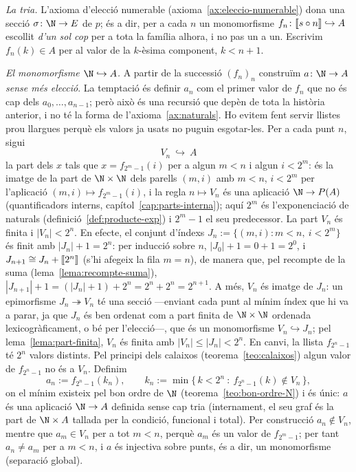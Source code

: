 \begin{prova}
\emph{La tria.} L'axioma d'elecció numerable
(axioma~\ref{ax:eleccio-numerable}) dona una secció
\(\sigma\colon\N\to E\) de \(p\); és a dir, per a cada \(n\) un monomorfisme
\(f_n\colon\llbracket s\circ n\rrbracket\hookrightarrow A\) escollit \emph{d'un sol cop}
per a tota la família alhora, i no pas un a un. Escrivim
\(f_n(k)\in A\) per al valor de la \(k\)-èsima component,
\(k<n+1\).

\emph{El monomorfisme \(\N\hookrightarrow A\).} A partir de la successió
\((f_n)_n\) construïm \(a\colon\N\to A\) \emph{sense més elecció}. La
temptació és definir \(a_n\) com el primer valor de \(f_n\) que no és cap
dels \(a_0,\dots,a_{n-1}\); però això és una recursió que depèn de tota la
història anterior, i no té la forma de l'axioma~\ref{ax:naturals}. Ho
evitem fent servir llistes prou llargues perquè els valors ja usats no
puguin esgotar-les. Per a cada punt \(n\), sigui
\[
V_n\ \hookrightarrow\ A
\]
la part dels \(x\) tals que \(x=f_{2^m-1}(i)\) per a algun \(m<n\) i algun
\(i<2^m\): és la imatge de la part de \(\N\times\N\) dels parells
\((m,i)\) amb \(m<n\), \(i<2^m\) per l'aplicació
\((m,i)\mapsto f_{2^m-1}(i)\), i la regla \(n\mapsto V_n\) és una
aplicació \(\N\to P(A)\) (quantificadors interns,
capítol~\ref{cap:parts-interna}); aquí \(2^m\) és l'exponenciació de
naturals (definició~\ref{def:producte-exp}) i \(2^m-1\) el seu
predecessor. La part \(V_n\) és finita i \(|V_n|<2^n\). En efecte, el conjunt
d'índexs \(J_n:=\{(m,i):m<n,\ i<2^m\}\) és finit amb \(|J_n|+1=2^n\): per
inducció sobre \(n\), \(|J_0|+1=0+1=2^0\), i
\(J_{n+1}\cong J_n+\llbracket 2^n\rrbracket\) (s'hi afegeix la fila \(m=n\)), de manera que,
pel recompte de la suma (lema~\ref{lema:recompte-suma}),
\(|J_{n+1}|+1=(|J_n|+1)+2^n=2^n+2^n=2^{n+1}\). A més, \(V_n\) és imatge de
\(J_n\): un epimorfisme \(J_n\twoheadrightarrow V_n\) té una secció ---enviant
cada punt al mínim índex que hi va a parar, ja que \(J_n\) és ben ordenat
com a part finita de \(\N\times\N\) ordenada lexicogràficament, o bé per
l'elecció---, que és un monomorfisme \(V_n\hookrightarrow J_n\); pel
lema~\ref{lema:part-finita}, \(V_n\) és finita amb
\(|V_n|\le|J_n|<2^n\). En canvi, la llista
\(f_{2^n-1}\) té \(2^n\) valors distints. Pel principi dels calaixos
(teorema~\ref{teo:calaixos}) algun valor de \(f_{2^n-1}\) no és a \(V_n\).
Definim
\[
a_n:=f_{2^n-1}(k_n),
\qquad
k_n:=\min\{\,k<2^n\ :\ f_{2^n-1}(k)\notin V_n\,\},
\]
on el mínim existeix pel bon ordre de \(\N\)
(teorema~\ref{teo:bon-ordre-N}) i és únic: \(a\) és una aplicació
\(\N\to A\) definida sense cap tria (internament, el seu graf és la part
de \(\N\times A\) tallada per la condició, funcional i total). Per
construcció \(a_n\notin V_n\), mentre que \(a_m\in V_n\) per a tot
\(m<n\), perquè \(a_m\) és un valor de \(f_{2^m-1}\); per tant
\(a_n\ne a_m\) per a \(m<n\), i \(a\) és injectiva sobre punts, és a dir,
un monomorfisme (separació global).


\end{prova}
